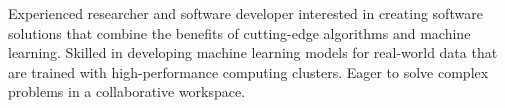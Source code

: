 

\begin{cvparagraph}

Experienced researcher and software developer interested in creating software solutions that combine the benefits of cutting-edge algorithms and machine learning. Skilled in developing machine learning models for real-world data that are trained with high-performance computing clusters. Eager to solve complex problems in a collaborative workspace.
\end{cvparagraph}
